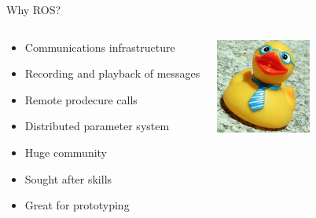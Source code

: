 \documentclass[aspectratio=43]{beamer}
\begin{document}
\begin{frame}{Why ROS?}
\begin{columns}
	\begin{column}{0.55\textwidth}
		\begin{itemize}
			\item Communications infrastructure
                          \item Recording and playback of messages
                          \item Remote prodecure calls
                          \item Distributed parameter system
                          \item Huge community
                          \item Sought after skills
                          \item Great for prototyping
		\end{itemize} 
        \end{column} 
        \begin{column}{0.45\textwidth} 
          \centering 
          \includegraphics[width=0.5\textwidth]{fig/yay-duckie.jpg} 
        \end{column}
\end{columns}

\end{frame}
\end{document}
